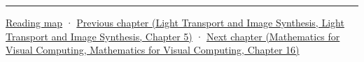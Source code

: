 \begin{center}\rule{0.5\linewidth}{0.5pt}\end{center}

\hyperref[volume-reading-map]{Reading map} · \href{../04-Light-Transport-and-Image-Synthesis/main.pdf\#nameddest=03-visual-computing-i-ch010-a-production-path-tracer-media-randomness-and-validation}{Previous chapter (Light Transport and Image Synthesis, Light Transport and Image Synthesis, Chapter 5)} · \href{../02-Mathematics-for-Visual-Computing/main.pdf\#nameddest=03-visual-computing-i-ch012-probability-statistics-and-uncertainty}{Next chapter (Mathematics for Visual Computing, Mathematics for Visual Computing, Chapter 16)}
